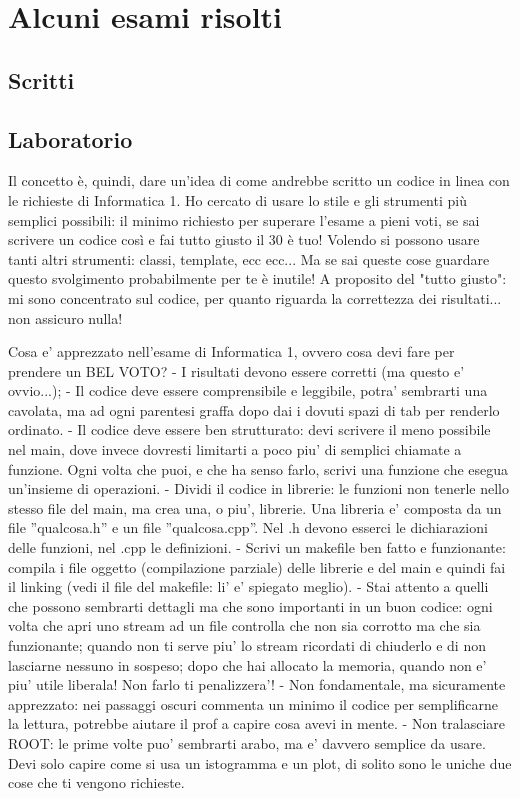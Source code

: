 \chapter{Alcuni esami risolti}
\section{Scritti}
\newpage
\section{Laboratorio}

Il concetto è, quindi, dare un'idea di come andrebbe scritto un codice in linea con le richieste di Informatica 1. Ho cercato di usare lo stile e gli strumenti più semplici possibili: il minimo richiesto per superare l'esame a pieni voti, se sai scrivere un codice così e fai tutto giusto il 30 è tuo! 
Volendo si possono usare tanti altri strumenti: classi, template, ecc ecc... Ma se sai queste cose guardare questo svolgimento probabilmente per te è inutile!
A proposito del "tutto giusto": mi sono concentrato sul codice, per quanto riguarda la correttezza dei risultati... non assicuro nulla!


Cosa e' apprezzato nell'esame di Informatica 1, ovvero cosa devi fare per prendere un BEL VOTO?
- I risultati devono essere corretti (ma questo e' ovvio...);
- Il codice deve essere comprensibile e leggibile, potra' sembrarti una cavolata, ma ad ogni parentesi graffa dopo dai i dovuti spazi di tab per renderlo ordinato.
- Il codice deve essere ben strutturato: devi scrivere il meno possibile nel main, dove invece dovresti limitarti a poco piu' di semplici chiamate a funzione. Ogni volta che puoi, e che ha senso farlo, scrivi una funzione che esegua un'insieme di operazioni. 
- Dividi il codice in librerie: le funzioni non tenerle nello stesso file del main, ma crea una, o piu', librerie. Una libreria e' composta da un file ''qualcosa.h'' e un file ''qualcosa.cpp''. Nel .h devono esserci le dichiarazioni delle funzioni, nel .cpp le definizioni. 
- Scrivi un makefile ben fatto e funzionante: compila i file oggetto (compilazione parziale) delle librerie e del main e quindi fai il linking (vedi il file del makefile: li' e' spiegato meglio).
- Stai attento a quelli che possono sembrarti dettagli ma che sono importanti in un buon codice: ogni volta che apri uno stream ad un file controlla che non sia corrotto ma che sia funzionante; quando non ti serve piu' lo stream ricordati di chiuderlo e di non lasciarne nessuno in sospeso; dopo che hai allocato la memoria, quando non e' piu' utile liberala! Non farlo ti penalizzera'! 
- Non fondamentale, ma sicuramente apprezzato: nei passaggi oscuri commenta un minimo il codice per semplificarne la lettura, potrebbe aiutare il prof a capire cosa avevi in mente.
- Non tralasciare ROOT: le prime volte puo' sembrarti arabo, ma e' davvero semplice da usare. Devi solo capire come si usa un istogramma e un plot, di solito sono le uniche due cose che ti vengono richieste. 


